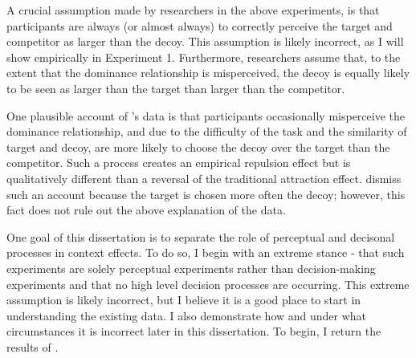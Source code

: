 A crucial assumption made by researchers in the above experiments, is that participants are always (or almost always) to correctly perceive the target and competitor as larger than the decoy. This assumption is likely incorrect, as I will show empirically in Experiment 1. Furthermore, researchers assume that, to the extent that the dominance relationship is misperceived, the decoy is equally likely to be seen as larger than the target than larger than the competitor. 

One plausible account of \textcite{spektorWhenGoodLooks2018b}'s data is that participants occasionally misperceive the dominance relationship, and due to the difficulty of the task and the similarity of target and decoy, are more likely to choose the decoy over the target than the competitor. Such a process creates an empirical repulsion effect but is qualitatively different than a reversal of the traditional attraction effect. \textcite{spektorWhenGoodLooks2018b} dismiss such an account because the target is chosen more often the decoy; however, this fact does not rule out the above explanation of the data.

One goal of this dissertation is to separate the role of perceptual and decisonal processes in context effects. To do so, I begin with an extreme stance - that such experiments are solely perceptual experiments rather than decision-making experiments and that no high level decision processes are occurring. This extreme assumption is likely incorrect, but I believe it is a good place to start in understanding the existing data. I also demonstrate how and under what circumstances it is incorrect later in this dissertation. To begin, I return the results of \textcite{spektorWhenGoodLooks2018b}. 

